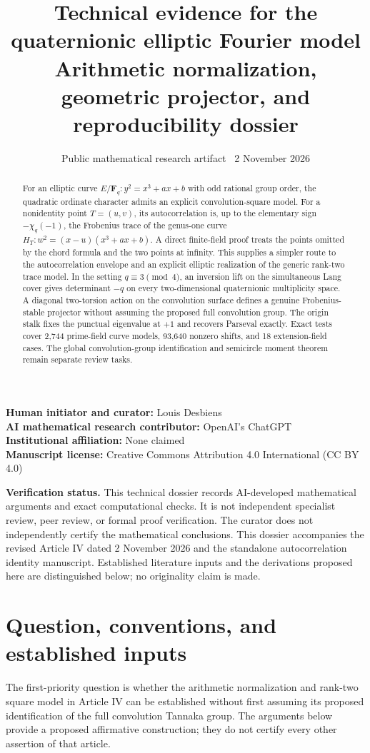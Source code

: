 \documentclass[11pt,a4paper]{article}
\title{Technical evidence for the quaternionic elliptic Fourier model\\[5pt]\large Arithmetic normalization, geometric projector, and reproducibility dossier}
\author{}
\date{Public mathematical research artifact \textbar\ 2 November 2026}
\numberwithin{equation}{section}
\newcommand{\F}{\mathbf F}
\begin{document}
\maketitle
\noindent\textbf{Human initiator and curator:} Louis Desbiens\\
\textbf{AI mathematical research contributor:} OpenAI's ChatGPT\\
 \textbf{Institutional affiliation:} None claimed\\
\textbf{Manuscript license:} Creative Commons Attribution 4.0 International (CC BY 4.0)

\noindent\textbf{Verification status.} This technical dossier records AI-developed mathematical arguments and exact computational checks. It is not independent specialist review, peer review, or formal proof verification. The curator does not independently certify the mathematical conclusions. This dossier accompanies the revised Article IV dated 2 November 2026 and the standalone autocorrelation identity manuscript. Established literature inputs and the derivations proposed here are distinguished below; no originality claim is made.

\begin{abstract}
For an elliptic curve $E/\F_q:y^2=x^3+ax+b$ with odd rational group order, the quadratic ordinate character admits an explicit convolution-square model. For a nonidentity point $T=(u,v)$, its autocorrelation is, up to the elementary sign $-\chi_q(-1)$, the Frobenius trace of the genus-one curve $H_T:w^2=(x-u)(x^3+ax+b)$. A direct finite-field proof treats the points omitted by the chord formula and the two points at infinity. This supplies a simpler route to the autocorrelation envelope and an explicit elliptic realization of the generic rank-two trace model. In the setting $q\equiv3\pmod4$, an inversion lift on the simultaneous Lang cover gives determinant $-q$ on every two-dimensional quaternionic multiplicity space. A diagonal two-torsion action on the convolution surface defines a genuine Frobenius-stable projector without assuming the proposed full convolution group. The origin stalk fixes the punctual eigenvalue at $+1$ and recovers Parseval exactly. Exact tests cover 2,744 prime-field curve models, 93,640 nonzero shifts, and 18 extension-field cases. The global convolution-group identification and semicircle moment theorem remain separate review tasks.
\end{abstract}

\section{Question, conventions, and established inputs}
The first-priority question is whether the arithmetic normalization and rank-two square model in Article IV can be established without first assuming its proposed identification of the full convolution Tannaka group. The arguments below provide a proposed affirmative construction; they do not certify every other assertion of that article.
\end{document}
